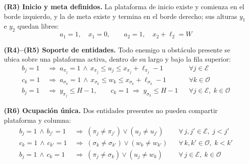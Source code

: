 \documentclass[letter, 10pt]{article}
\begin{document}
\textbf{(R3) Inicio y meta definidos.} La plataforma de inicio existe y comienza en el borde izquierdo, y la de meta existe y termina en el borde derecho; sus alturas $y_1$ e $y_2$ quedan libres:
\begin{equation}
a_1 = 1, \quad x_1 = 0, \qquad a_2 = 1, \quad x_2 + \ell_2 = W
\end{equation}

\textbf{(R4)--(R5) Soporte de entidades.} Todo enemigo u obst\'aculo presente se ubica sobre una plataforma activa, dentro de su largo y bajo la fila superior:
\begin{align}
b_j = 1 \;&\Rightarrow\; a_{\pi_j} = 1 \,\wedge\, x_{\pi_j} \leq u_j \leq x_{\pi_j} + \ell_{\pi_j} - 1 && \forall j \in \mathcal{E} \\
c_k = 1 \;&\Rightarrow\; a_{\sigma_k} = 1 \,\wedge\, x_{\sigma_k} \leq w_k \leq x_{\sigma_k} + \ell_{\sigma_k} - 1 && \forall k \in \mathcal{O} \\
b_j = 1 \;&\Rightarrow\; y_{\pi_j} \leq H-1, \qquad c_k = 1 \;\Rightarrow\; y_{\sigma_k} \leq H-1 && \forall j \in \mathcal{E},\; k \in \mathcal{O}
\end{align}

\textbf{(R6) Ocupaci\'on \'unica.} Dos entidades presentes no pueden compartir plataforma y columna:
\begin{align}
b_j = 1 \,\wedge\, b_{j'} = 1 \;&\Rightarrow\; (\pi_j \neq \pi_{j'}) \vee (u_j \neq u_{j'}) && \forall\, j, j' \in \mathcal{E},\; j < j' \\
c_k = 1 \,\wedge\, c_{k'} = 1 \;&\Rightarrow\; (\sigma_k \neq \sigma_{k'}) \vee (w_k \neq w_{k'}) && \forall\, k, k' \in \mathcal{O},\; k < k' \\
b_j = 1 \,\wedge\, c_k = 1 \;&\Rightarrow\; (\pi_j \neq \sigma_k) \vee (u_j \neq w_k) && \forall\, j \in \mathcal{E},\; k \in \mathcal{O}
\end{align}
\end{document}
